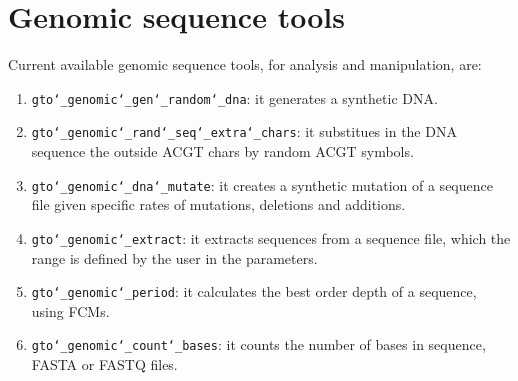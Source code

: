\chapter{Genomic sequence tools}
\label{gst}

Current available genomic sequence tools, for analysis and manipulation, are:
\begin{enumerate}

\item \texttt{gto\char`_genomic\char`_gen\char`_random\char`_dna}: it generates a synthetic DNA.

\item \texttt{gto\char`_genomic\char`_rand\char`_seq\char`_extra\char`_chars}: it substitues in the DNA sequence the outside ACGT chars by random ACGT symbols.

\item \texttt{gto\char`_genomic\char`_dna\char`_mutate}: it creates a synthetic mutation of a sequence file given specific rates of mutations, deletions and additions.

\item \texttt{gto\char`_genomic\char`_extract}: it extracts sequences from a sequence file, which the range is defined by the user in the parameters.

\item \texttt{gto\char`_genomic\char`_period}: it calculates the best order depth of a sequence, using FCMs.

\item \texttt{gto\char`_genomic\char`_count\char`_bases}: it counts the number of bases in sequence, FASTA or FASTQ files.
\end{enumerate}







